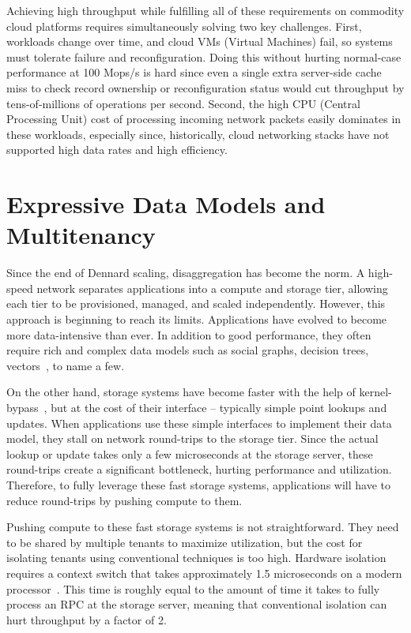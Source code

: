 Achieving high throughput while fulfilling all of these requirements on
commodity cloud platforms requires simultaneously solving two key
challenges.
%
First, workloads change over time, and cloud VMs (Virtual Machines) fail, so
systems must tolerate failure and reconfiguration.
%
Doing this without
hurting normal-case performance at 100 Mops/s is hard since even a
single extra server-side cache miss to check record ownership or
reconfiguration status would cut throughput by tens-of-millions of
operations per second.
%
Second, the high CPU (Central Processing Unit) cost of processing incoming
network packets easily dominates in these workloads, especially since,
historically, cloud networking stacks have not supported high data rates
and high efficiency.

\section{Expressive Data Models and Multitenancy}

Since the end of Dennard scaling, disaggregation has become the norm.
%
A high-speed network separates applications into a compute and
storage tier, allowing each tier to be
provisioned, managed, and scaled independently.
%
However, this approach
is beginning to reach its limits.
%
Applications have evolved to become more data-intensive than ever.
%
In addition to good performance, they often require rich and complex
data models such as social graphs, decision trees,
vectors~\cite{fb-memcache,parameter-server}, to name a few.

On the other hand, storage systems have become faster with the help of
kernel-bypass~\cite{ramcloud,farm-txns}, but at the cost of their
interface – typically simple point lookups and updates.
%
When applications use these simple interfaces to implement their data
model, they stall on network round-trips to the
storage tier.
%
Since the actual lookup or update takes only a few
microseconds at the storage server, these round-trips create a
significant
bottleneck, hurting performance and utilization.
%
Therefore, to fully
leverage these fast storage systems, applications will have to reduce
round-trips by pushing compute to them.

Pushing compute to these fast storage systems is
not straightforward.
%
They need to be shared by multiple tenants to maximize utilization,
but the cost for isolating tenants using conventional techniques is too
high.
%
Hardware isolation
requires a context switch that takes approximately
1.5 microseconds on a modern processor~\cite{splinter}.
%
This time
is roughly equal to the amount of time it takes to
fully process an RPC at the storage server, meaning
that conventional isolation can hurt throughput by
a factor of 2.

